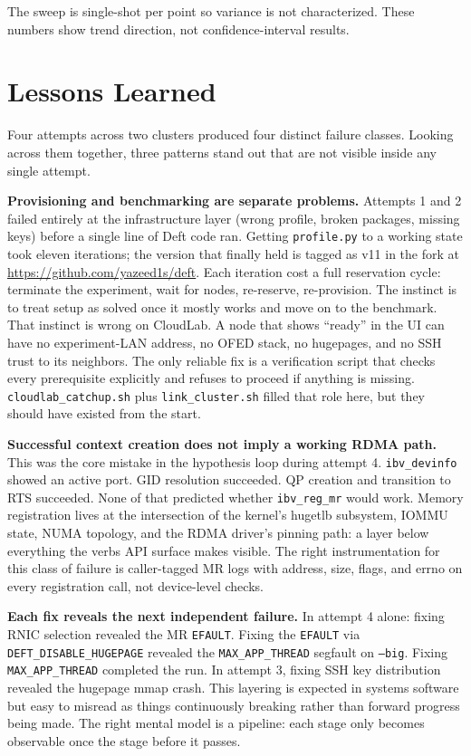 \documentclass[10pt]{article}
\begin{document}
The sweep is single-shot per point so variance is not characterized.
These numbers show trend direction, not confidence-interval results.

\section{Lessons Learned}

Four attempts across two clusters produced four distinct failure classes.
Looking across them together, three patterns stand out that are not visible
inside any single attempt.

\textbf{Provisioning and benchmarking are separate problems.}
Attempts 1 and 2 failed entirely at the infrastructure layer (wrong profile,
broken packages, missing keys) before a single line of Deft code ran.
Getting \texttt{profile.py} to a working state took eleven iterations; the version
that finally held is tagged as v11 in the fork at \url{https://github.com/yazeed1s/deft}.
Each iteration cost a full reservation cycle: terminate the experiment, wait for
nodes, re-reserve, re-provision.
The instinct is to treat setup as solved once it mostly works and move on to the
benchmark.
That instinct is wrong on CloudLab.
A node that shows ``ready'' in the UI can have no experiment-LAN address, no OFED
stack, no hugepages, and no SSH trust to its neighbors.
The only reliable fix is a verification script that checks every prerequisite
explicitly and refuses to proceed if anything is missing.
\texttt{cloudlab\_catchup.sh} plus \texttt{link\_cluster.sh} filled that role here,
but they should have existed from the start.

\textbf{Successful context creation does not imply a working RDMA path.}
This was the core mistake in the hypothesis loop during attempt 4.
\texttt{ibv\_devinfo} showed an active port.
GID resolution succeeded.
QP creation and transition to RTS succeeded.
None of that predicted whether \texttt{ibv\_reg\_mr} would work.
Memory registration lives at the intersection of the kernel's hugetlb subsystem,
IOMMU state, NUMA topology, and the RDMA driver's pinning path: a layer below
everything the verbs API surface makes visible.
The right instrumentation for this class of failure is caller-tagged MR logs
with address, size, flags, and errno on every registration call, not device-level
checks.

\textbf{Each fix reveals the next independent failure.}
In attempt 4 alone: fixing RNIC selection revealed the MR \texttt{EFAULT}.
Fixing the \texttt{EFAULT} via \texttt{DEFT\_DISABLE\_HUGEPAGE} revealed the
\texttt{MAX\_APP\_THREAD} segfault on \texttt{--big}.
Fixing \texttt{MAX\_APP\_THREAD} completed the run.
In attempt 3, fixing SSH key distribution revealed the hugepage mmap crash.
This layering is expected in systems software but easy to misread as things
continuously breaking rather than forward progress being made.
The right mental model is a pipeline: each stage only becomes observable
once the stage before it passes.
\end{document}

